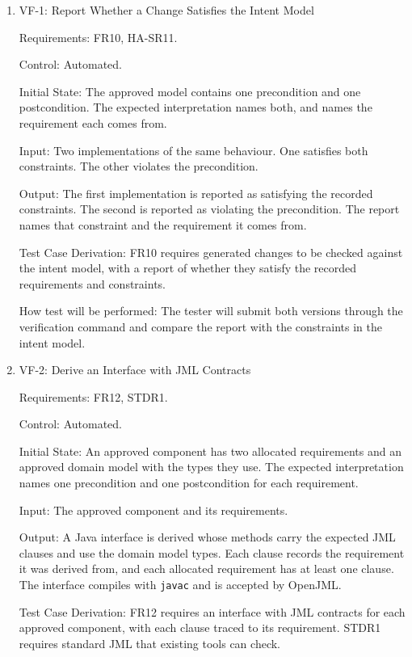 \documentclass[12pt, titlepage]{article}
\begin{document}
\begin{enumerate}

\item{VF-1: Report Whether a Change Satisfies the Intent Model\\}

Requirements: FR10, HA-SR11.

Control: Automated.

Initial State: The approved model contains one precondition and one
postcondition. The expected interpretation names both, and names the
requirement each comes from.

Input: Two implementations of the same behaviour. One satisfies both
constraints. The other violates the precondition.

Output: The first implementation is reported as satisfying the recorded
constraints. The second is reported as violating the precondition. The
report names that constraint and the requirement it comes from.

Test Case Derivation: FR10 requires generated changes to be checked against
the intent model, with a report of whether they satisfy the recorded
requirements and constraints.

How test will be performed: The tester will submit both versions through
the verification command and compare the report with the constraints in
the intent model.

\item{VF-2: Derive an Interface with JML Contracts\\}

Requirements: FR12, STDR1.

Control: Automated.

Initial State: An approved component has two allocated requirements and an
approved domain model with the types they use. The expected interpretation
names one precondition and one postcondition for each requirement.

Input: The approved component and its requirements.

Output: A Java interface is derived whose methods carry the expected JML
clauses and use the domain model types. Each clause records the requirement
it was derived from, and each allocated requirement has at least one clause.
The interface compiles with \texttt{javac} and is accepted by OpenJML.

Test Case Derivation: FR12 requires an interface with JML contracts for each
approved component, with each clause traced to its requirement. STDR1
requires standard JML that existing tools can check.


\end{enumerate}
\end{document}
